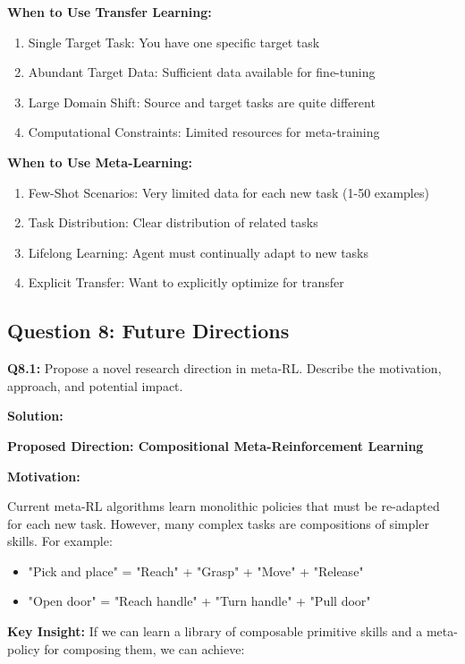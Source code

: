 \documentclass[12pt]{article}
\begin{document}
{{			\textbf{When to Use Transfer Learning:}
			\begin{enumerate}
				\item Single Target Task: You have one specific target task
				\item Abundant Target Data: Sufficient data available for fine-tuning
				\item Large Domain Shift: Source and target tasks are quite different
				\item Computational Constraints: Limited resources for meta-training
			\end{enumerate}
			
			\textbf{When to Use Meta-Learning:}
			\begin{enumerate}
				\item Few-Shot Scenarios: Very limited data for each new task (1-50 examples)
				\item Task Distribution: Clear distribution of related tasks
				\item Lifelong Learning: Agent must continually adapt to new tasks
				\item Explicit Transfer: Want to explicitly optimize for transfer
			\end{enumerate}
			
			\subsection{Question 8: Future Directions}
			
			\textbf{Q8.1:} Propose a novel research direction in meta-RL. Describe the motivation, approach, and potential impact.
			
			\textbf{Solution:}
			
			\textbf{Proposed Direction: Compositional Meta-Reinforcement Learning}
			
			\textbf{Motivation:}
			
			Current meta-RL algorithms learn monolithic policies that must be re-adapted for each new task. However, many complex tasks are compositions of simpler skills. For example:
			
			\begin{itemize}
				\item "Pick and place" = "Reach" + "Grasp" + "Move" + "Release"
				\item "Open door" = "Reach handle" + "Turn handle" + "Pull door"
			\end{itemize}
			
			\textbf{Key Insight:} If we can learn a library of composable primitive skills and a meta-policy for composing them, we can achieve:
			
}}
\end{document}
